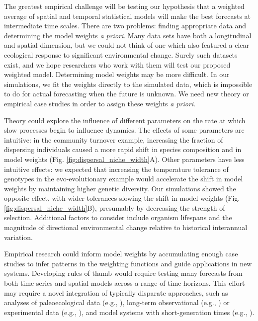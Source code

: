 \documentclass[11pt]{article}
\begin{document}
The greatest empirical challenge will be testing our hypothesis that a weighted average of spatial and temporal statistical models will make the best forecasts at intermediate time scales. There are two problems: finding appropriate data and determining the model weights \emph{a priori}. Many data sets have both a longitudinal and spatial dimension, but we could not think of one which also featured a clear ecological response to significant environmental change. Surely such datasets exist, and we hope researchers who work with them will test our proposed weighted model. Determining model weights may be more difficult. In our simulations, we fit the weights directly to the simulated data, which is impossible to do for actual forecasting when the future is unknown. We need new theory or empirical case studies in order to assign these weights \emph{a priori}. 

Theory could explore the influence of different parameters on the rate at which slow processes begin to influence dynamics. The effects of some parameters are intuitive: in the community turnover example, increasing the fraction of dispersing individuals caused a more rapid shift in species composition and in model weights (Fig. \ref{fig:dispersal_niche_width}A). Other parameters have less intuitive effects: we expected that increasing the temperature tolerance of genotypes in the evo-evolutionary example would accelerate the shift in model weights by maintaining higher genetic diversity. Our simulations showed the opposite effect, with wider tolerances slowing the shift in model weights (Fig. \ref{fig:dispersal_niche_width}B), presumably by decreasing the strength of selection. Additional factors to consider include organism lifespans and the magnitude of directional environmental change relative to historical interannual variation. 

Empirical research could inform model weights by accumulating enough case studies to infer patterns in the weighting functions and guide applications in new systems. Developing  rules of thumb would require testing many forecasts from both time-series and spatial models across a range of time-horizons. This effort may require a novel integration of typically disparate approaches, such as analyses of paleoecological data (e.g., \citealt{Worth2014}), long-term observational (e.g., \citealt{Nice2019}) or experimental data (e.g., \citealt{Silvertown2006}), and model systems with short-generation times (e.g., \citealt{Good2017}).
\end{document}
